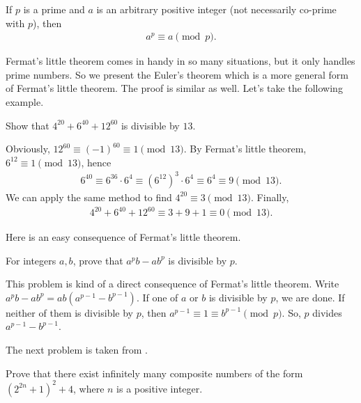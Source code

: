 \documentclass{subfile}
\begin{document}
		 \begin{corollary}
		 	If $p$ is a prime and $a$ is an arbitrary positive integer (not necessarily co-prime with $p$), then
		 	\begin{align*}
		 	a^p \equiv a \pmod p.
		 	\end{align*}
		 \end{corollary}
	Fermat's little theorem comes in handy in so many situations, but it only handles prime numbers. So we present the Euler's theorem which is a more general form of Fermat's little theorem. The proof is similar as well. Let's take the following example.

		\begin{problem}
			Show that $4^{20} + 6^{40} + 12^{60}$ is divisible by $13$.
		\end{problem}

		\begin{solution}
			Obviously, $12^{60}\equiv (-1)^{60} \equiv 1 \pmod {13}$. By Fermat's little theorem, $6^{12} \equiv 1 \pmod{13}$, hence
				\begin{align*}
					6^{40} \equiv 6^{36} \cdot 6^4 \equiv \left(6^{12}\right)^3 \cdot 6^4 \equiv 6^4 \equiv 9 \pmod{13}.
				\end{align*}
			We can apply the same method to find $4^{20} \equiv 3 \pmod{13}$. Finally,
				\begin{align*}
					4^{20} + 6^{40} + 12^{60} \equiv 3+9+1 \equiv 0 \pmod{13}.
				\end{align*}
		\end{solution}
	Here \textcite[Page $29$, Example $1.29$]{andreescuandricafeng2007} is an easy consequence of Fermat's little theorem.
		\begin{problem}\label{e2}
			For integers $a,b$, prove that $a^pb-ab^p$ is divisible by $p$.
		\end{problem}

		\begin{solution}
			This problem is kind of a direct consequence of Fermat's little theorem. Write $a^pb-ab^p=ab(a^{p-1}-b^{p-1})$. If one of $a$ or $b$ is divisible by $p$, we are done. If neither of them is divisible by $p$, then $a^{p-1}\equiv1\equiv b^{p-1}\pmod p$. So, $p$ divides $a^{p-1}-b^{p-1}$.
		\end{solution}
	The next problem is taken from \textcite[Problem $124$]{WaclawSierpinski1964}.
		\begin{problem}
			Prove that there exist infinitely many composite numbers of the form $(2^{2n}+1 )^2+4$, where $n$ is a positive integer.
		\end{problem}
\end{document}
